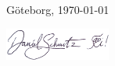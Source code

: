 \documentclass[10pt,a4paper,ragged2e,withhyper,normalphoto]{altacv}
\begin{document}
\begin{paracol}{2}
\nocite{*}



%
%
%
%
%
%
%
\end{paracol}

\vfill
Göteborg, \today

\vspace{12pt}
\includegraphics*[height=30pt]{signature.png}
\end{document}
